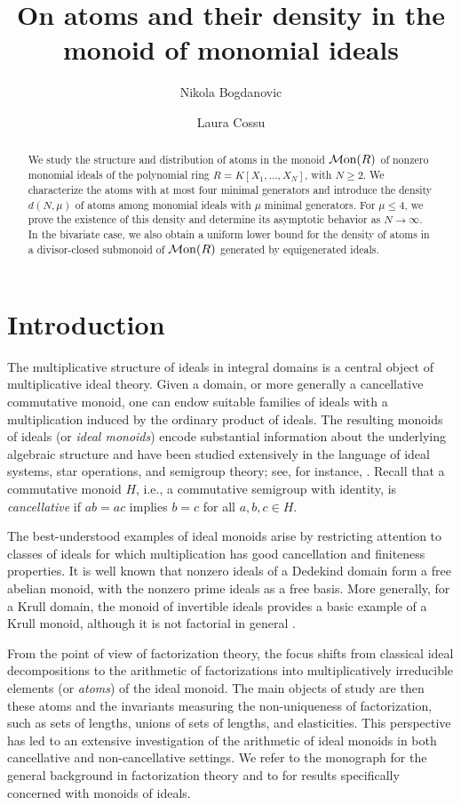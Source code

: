 \documentclass[a4paper,10pt,reqno]{amsart}
\title{On atoms and their density in the monoid of monomial ideals}
\author{Nikola Bogdanovic}
\author{Laura Cossu}
\theoremstyle{definition}
\theoremstyle{definition}
\providecommand\Mon{{\mathcal{M}{\rm on}}}
\begin{document}
\begin{abstract}
We study the structure and distribution of atoms in the monoid $\Mon(R)$ of nonzero monomial ideals of the polynomial ring $R=K[X_1,\ldots, X_N]$, with $N\ge 2$. We characterize the atoms with at most four minimal generators and introduce the density $d(N,\mu)$ of atoms among monomial ideals with $\mu$ minimal generators. For $\mu\le 4$, we prove the existence of this density and determine its asymptotic behavior as $N\to\infty$. In the bivariate case, we also obtain a uniform lower bound for the density of atoms in a divisor-closed submonoid of $\Mon(R)$ generated by equigenerated ideals.
\end{abstract}
\maketitle

\section{Introduction}
The multiplicative structure of ideals in integral domains is a central object of multiplicative ideal theory. Given a domain, or more generally a cancellative commutative monoid, one can endow suitable families of ideals with a multiplication induced by the ordinary product of ideals. The resulting monoids of ideals (or {\it ideal monoids}) encode substantial information about the underlying algebraic structure and have been studied extensively in the language of ideal systems, star operations, and semigroup theory; see, for instance, \cite{Hal-Ko98,Fo-Ho-Lu13,Rein12}. Recall that a commutative monoid $H$, i.e., a commutative semigroup with identity, is {\it cancellative} if $ab=ac$ implies $b=c$ for all $a,b,c\in H$.

The best-understood examples of ideal monoids arise by restricting attention to classes of ideals for which multiplication has good cancellation and finiteness properties. It is well known that nonzero ideals of a Dedekind domain form a free abelian monoid, with the nonzero prime ideals as a free basis. More generally, for a Krull domain, the monoid of invertible ideals provides a basic example of a Krull monoid, although it is not factorial in general \cite[Section 4]{Ge-Kh22}. 

From the point of view of factorization theory, the focus shifts from classical ideal decompositions to the arithmetic of factorizations into multiplicatively irreducible elements (or {\it atoms}) of the ideal monoid. The main objects of study are then these atoms and the invariants measuring the non-uniqueness of factorization, such as sets of lengths, unions of sets of lengths, and elasticities. This perspective has led to an extensive investigation of the arithmetic of ideal monoids in both cancellative and non-cancellative settings. We refer to the monograph \cite{Ge-HK} for the general background in factorization theory and to \cite{Fan17, Ge-Re19, Ge-Kh22} for results specifically concerned with monoids of ideals.
\end{document}
